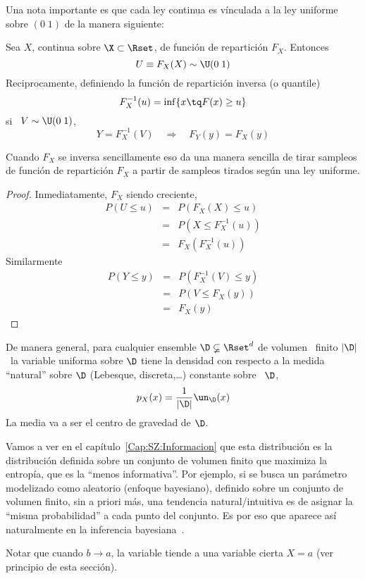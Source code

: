 Una nota  importante es que cada ley  continua es v\'inculada a  la ley uniforme
sobre $(0 \; 1)$ de la manera siguiente:
%
\begin{lema}[Inversi\'on]\label{Lem:MP:InversionUniforme}
Sea $X$, continua sobre $\X \subset \Rset$, de funci\'on de repartici\'on $F_X$. Entonces
%
\[
U \equiv F_X(X) \sim \U(0 \; 1)
\]
%
Reciprocamente, definiendo la funci\'on de repartici\'on inversa (o quantile)
%
\[
F_X^{-1}(u) = \inf \{ x \tq F(x) \ge u \}
\]
%
si \ $V \sim \U( 0 \; 1 )$,
%
\[
Y = F_X^{-1}(V) \quad \Rightarrow \quad F_Y(y) = F_X(y)
\]
\end{lema}
%
Cuando  $F_X$ se  inversa  sencillamente eso  da  una manera  sencilla de  tirar
sampleos de funci\'on de repartici\'on $F_X$ a partir de sampleos tirados seg\'un
una ley uniforme.
%
\begin{proof}
Inmediatamente, $F_X$ siendo creciente,
%
\begin{eqnarray*}
P(U \le u) & = &  P( F_X(X) \le u)\\[2mm]
%
& = & P(X \le F_X^{-1}(u))\\[2mm]
%
& = & F_X\left( F_X^{-1} (u) \right)
\end{eqnarray*}
%
Similarmente
%
\begin{eqnarray*}
P(Y \le y) & = &  P( F_X^{-1}(V) \le y)\\[2mm]
%
& = & P(V \le F_X(y))\\[2mm]
%
& = & F_X(y)
\end{eqnarray*}
%
\end{proof}

De manera  general, para  cualquier ensemble $\D  \varsubsetneq \Rset^d$ de  volumen \
finito $|\D|$ \,  la variable uniforma sobre $\D$  tiene la densidad con  respecto a la
medida  ``natural'' sobre  $\D$  (Lebesque, discreta,\ldots)  constante sobre  \
$\D$,
%
\[
p_X(x) = \frac{1}{|\D|} \un_{\D}(x)
\]
%
La media va a ser el centro de gravedad de $\D$.

Vamos a ver en el cap\'itulo~\ref{Cap:SZ:Informacion} que esta distribuci\'on es
la distribuci\'on definida  sobre un conjunto de volumen  finito que maximiza la
entrop\'ia, \ie  que es la  ``menos informativa''. Por  ejemplo, si se  busca un
par\'ametro  modelizado como  aleatorio (enfoque  bayesiano), definido  sobre un
conjunto de volumen finito, sin  a priori m\'as, una tendencia natural/intuitiva
es de  asignar la ``misma probabilidad'' a  cada punto del conjunto.  Es por eso
que aparece as\'i naturalmente en la inferencia bayesiana~\cite{Rob07}.
 
Notar que  cuando $b \to a$,  la variable tiende a  una variable cierta  $X = a$
(ver principio de esta secci\'on).
